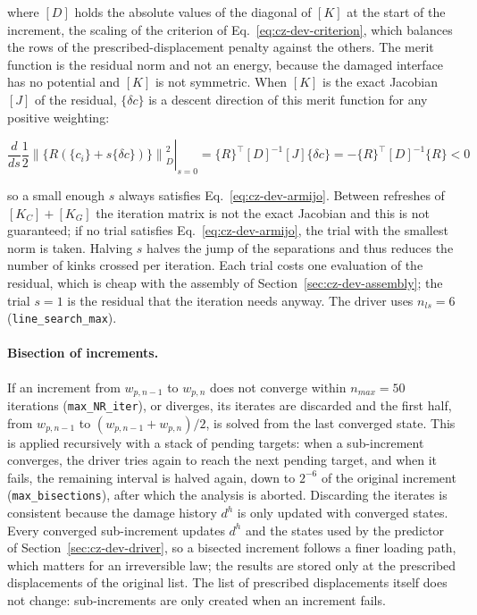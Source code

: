 \noindent where $[D]$ holds the absolute values of the diagonal of $[K]$ at the start of the increment, the scaling of the criterion of Eq.~\ref{eq:cz-dev-criterion}, which balances the rows of the prescribed-displacement penalty against the others. The merit function is the residual norm and not an energy, because the damaged interface has no potential and $[K]$ is not symmetric. When $[K]$ is the exact Jacobian $[J]$ of the residual, $\{\delta c\}$ is a descent direction of this merit function for any positive weighting:

\begin{equation}\label{eq:cz-dev-descent}
	\left. \frac{d}{ds} \frac{1}{2} \left\| \{R(\{c_i\} + s\{\delta c\})\} \right\|_D^2 \right|_{s=0} = \{R\}^\top [D]^{-1} [J] \{\delta c\} = - \{R\}^\top [D]^{-1} \{R\} < 0
\end{equation}

\noindent so a small enough $s$ always satisfies Eq.~\ref{eq:cz-dev-armijo}. Between refreshes of $[K_C] + [K_G]$ the iteration matrix is not the exact Jacobian and this is not guaranteed; if no trial satisfies Eq.~\ref{eq:cz-dev-armijo}, the trial with the smallest norm is taken. Halving $s$ halves the jump of the separations and thus reduces the number of kinks crossed per iteration. Each trial costs one evaluation of the residual, which is cheap with the assembly of Section~\ref{sec:cz-dev-assembly}; the trial $s = 1$ is the residual that the iteration needs anyway. The driver uses $n_{ls} = 6$ (\texttt{line\_search\_max}).

\paragraph{Bisection of increments.} If an increment from $w_{p,n-1}$ to $w_{p,n}$ does not converge within $n_{max} = 50$ iterations (\texttt{max\_NR\_iter}), or diverges, its iterates are discarded and the first half, from $w_{p,n-1}$ to $(w_{p,n-1} + w_{p,n})/2$, is solved from the last converged state. This is applied recursively with a stack of pending targets: when a sub-increment converges, the driver tries again to reach the next pending target, and when it fails, the remaining interval is halved again, down to $2^{-6}$ of the original increment (\texttt{max\_bisections}), after which the analysis is aborted. Discarding the iterates is consistent because the damage history $d^h$ is only updated with converged states. Every converged sub-increment updates $d^h$ and the states used by the predictor of Section~\ref{sec:cz-dev-driver}, so a bisected increment follows a finer loading path, which matters for an irreversible law; the results are stored only at the prescribed displacements of the original list. The list of prescribed displacements itself does not change: sub-increments are only created when an increment fails.

